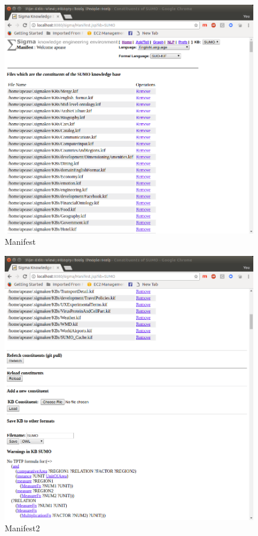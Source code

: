 \documentclass{book}
\begin{document}
\begin{figure}
  \centering
  \includegraphics[width=4.5in]{pictures/Manifest.png}
  \caption{Manifest}
  \label{fig:Manifest}
\end{figure}

\begin{figure}
  \centering
  \includegraphics[width=4.5in]{pictures/Manifest2.png}
  \caption{Manifest2}
  \label{fig:Manifest2}
\end{figure}
\end{document}
